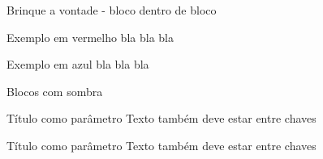\documentclass[xcolor=svgnames,8pt]{beamer}
\begin{document}
\begin{frame}{Brinque a vontade - bloco dentro de bloco}
    \begin{exemplo_red}{Exemplo em vermelho}
        bla bla bla
        \begin{exemplo_blue}{Exemplo em azul}
            bla bla bla
        \end{exemplo_blue}
    \end{exemplo_red}
    
\end{frame}

\begin{frame}{Blocos com sombra}
    
    \begin{exemplo_red_shadow}{Título como parâmetro}
    {Texto também deve estar entre chaves}
    \end{exemplo_red_shadow}

    \begin{exemplo_blue_shadow}{Título como parâmetro}
    {Texto também deve estar entre chaves}
    \end{exemplo_blue_shadow}

\end{frame}
\end{document}
